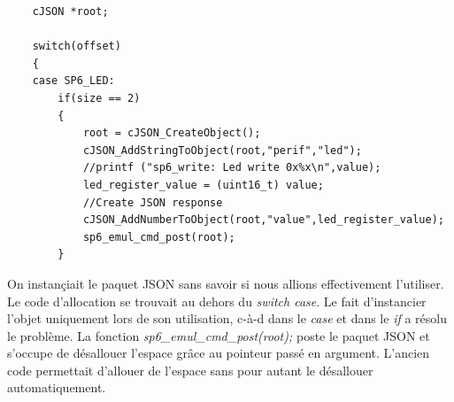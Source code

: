 \begin{lstlisting}
	cJSON *root;

	switch(offset)
	{
	case SP6_LED:
		if(size == 2)
		{
			root = cJSON_CreateObject();
			cJSON_AddStringToObject(root,"perif","led");
			//printf ("sp6_write: Led write 0x%x\n",value);
			led_register_value = (uint16_t) value;
			//Create JSON response
			cJSON_AddNumberToObject(root,"value",led_register_value);
			sp6_emul_cmd_post(root);
		}
\end{lstlisting}
On instançiait le paquet JSON sans savoir si nous allions effectivement l'utiliser. Le code d'allocation se trouvait au dehors du \textit{switch case}. Le fait d'instancier l'objet uniquement lors de son utilisation, c-à-d dans le \textit{case} et dans le \textit{if} a résolu le problème. La fonction \textit{sp6\_emul\_cmd\_post(root);} poste le paquet JSON et s'occupe de désallouer l'espace grâce au pointeur passé en argument. L'ancien code permettait d'allouer de l'espace sans pour autant le désallouer automatiquement. 


